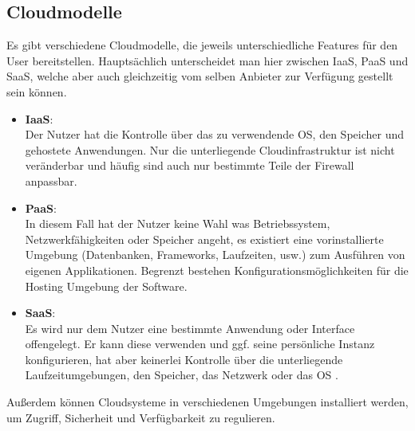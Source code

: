 \subsection{Cloudmodelle}

Es gibt verschiedene Cloudmodelle, die jeweils unterschiedliche Features für den User bereitstellen. Hauptsächlich unterscheidet man hier zwischen \ac{IaaS}, \ac{PaaS} und \ac{SaaS}, welche aber auch gleichzeitig vom selben Anbieter zur Verfügung gestellt sein können.

\begin{itemize}
	\item \textbf{IaaS}:\\
	Der Nutzer hat die Kontrolle über das zu verwendende OS, den Speicher und gehostete Anwendungen. Nur die unterliegende Cloudinfrastruktur ist nicht veränderbar und häufig sind auch nur bestimmte Teile der Firewall anpassbar.
	\item \textbf{PaaS}:\\
	In diesem Fall hat der Nutzer keine Wahl was Betriebssystem, Netzwerkfähigkeiten oder Speicher angeht, es existiert eine vorinstallierte Umgebung (Datenbanken, Frameworks, Laufzeiten, usw.) zum Ausführen von eigenen Applikationen. Begrenzt bestehen Konfigurationsmöglichkeiten für die Hosting Umgebung der Software. 
	\item \textbf{SaaS}:\\
	Es wird nur dem Nutzer eine bestimmte Anwendung oder Interface offengelegt. Er kann diese verwenden und ggf. seine persönliche Instanz konfigurieren, hat aber keinerlei Kontrolle über die unterliegende Laufzeitumgebungen, den Speicher, das Netzwerk oder das \acs{OS} \parencite[S. 15f]{rafaels.2015}.
\end{itemize}

Außerdem können Cloudsysteme in verschiedenen Umgebungen installiert werden, um Zugriff, Sicherheit und Verfügbarkeit zu regulieren.

